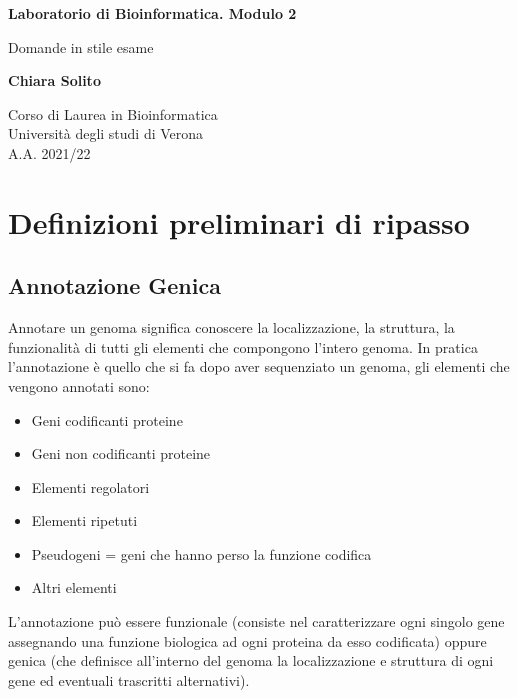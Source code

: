 \documentclass{article}
\begin{document}
\begin{titlepage}
    \begin{center}
        \vspace*{1cm}
            
        \Huge
        \textbf{Laboratorio di Bioinformatica. Modulo 2}
            
        \vspace{0.5cm}
        \LARGE
        Domande in stile esame
            
        \vspace{1.5cm}
            
        \textbf{Chiara Solito}

        \vspace{0.8cm}

            
        \Large
        Corso di Laurea in Bioinformatica\\
        Università degli studi di Verona\\
        A.A. 2021/22
            
    \end{center}
\end{titlepage}

\section*{Definizioni preliminari di ripasso}
\subsection*{Annotazione Genica}
Annotare un genoma significa conoscere la localizzazione, la struttura, la funzionalità di tutti gli elementi che compongono l'intero genoma. 
In pratica l'annotazione è quello che si fa dopo aver sequenziato un genoma, gli elementi che vengono annotati sono:
\begin{itemize}
    \item Geni codificanti proteine 
    \item Geni non codificanti proteine 
    \item Elementi regolatori 
    \item Elementi ripetuti 
    \item Pseudogeni = geni che hanno perso la funzione codifica 
    \item Altri elementi 
\end{itemize}
L'annotazione può essere funzionale (consiste nel caratterizzare ogni singolo gene assegnando una funzione biologica ad ogni proteina da esso codificata) oppure genica (che definisce all'interno del genoma
la localizzazione e struttura di ogni gene ed eventuali trascritti alternativi).
\end{document}
